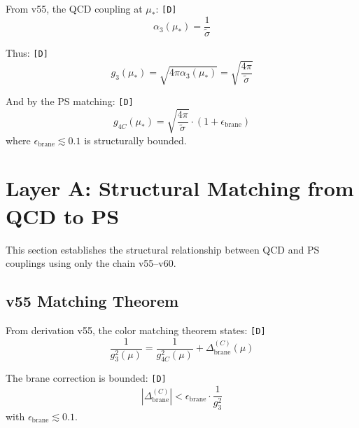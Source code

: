 \documentclass[11pt,a4paper]{article}
\newcommand{\tagD}{\textcolor{green!50!black}{\texttt{[D]}}}
\theoremstyle{definition}
\begin{document}
\begin{derivbox}
From v55, the QCD coupling at $\mu_*$: \tagD{}
\begin{equation}
\label{eq:alpha3-mustar-import}
\boxed{\alpha_3(\mu_*) = \frac{1}{\tilde{\sigma}}}
\end{equation}

Thus: \tagD{}
\begin{equation}
\label{eq:g3-mustar-derived}
\boxed{g_3(\mu_*) = \sqrt{4\pi \alpha_3(\mu_*)} = \sqrt{\frac{4\pi}{\tilde{\sigma}}}}
\end{equation}

And by the PS matching: \tagD{}
\begin{equation}
\label{eq:g4c-mustar-derived}
\boxed{g_{4C}(\mu_*) = \sqrt{\frac{4\pi}{\tilde{\sigma}}} \cdot (1 + \epsilon_{\text{brane}})}
\end{equation}
where $\epsilon_{\text{brane}} \lesssim 0.1$ is structurally bounded.
\end{derivbox}

\section{Layer A: Structural Matching from QCD to PS}
\label{sec:structural-matching}

\begin{derivbox}
This section establishes the structural relationship between QCD and PS couplings
using only the chain v55--v60.
\end{derivbox}

\subsection{v55 Matching Theorem}
\label{subsec:v55-matching}

From derivation v55, the color matching theorem states: \tagD{}
\begin{equation}
\label{eq:v55-color-matching}
\boxed{\frac{1}{g_3^2(\mu)} = \frac{1}{g_{4C}^2(\mu)} + \Delta_{\text{brane}}^{(C)}(\mu)}
\end{equation}

The brane correction is bounded: \tagD{}
\begin{equation}
\label{eq:brane-bound}
|\Delta_{\text{brane}}^{(C)}| < \epsilon_{\text{brane}} \cdot \frac{1}{g_3^2}
\end{equation}
with $\epsilon_{\text{brane}} \lesssim 0.1$.
\end{document}
